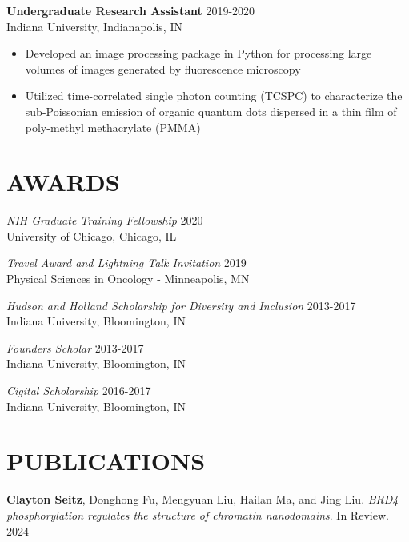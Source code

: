 \documentclass[margin, 10pt]{res} %
\begin{document}
\begin{resume}
\begin{itemize}
\end{itemize}
 
\textbf{Undergraduate Research Assistant} \hfill 2019-2020\\
Indiana University, Indianapolis, IN
\begin{itemize} \itemsep -2pt

\item Developed an image processing package in Python for processing large volumes of images generated by fluorescence microscopy

\item Utilized time-correlated single photon counting (TCSPC) to characterize the sub-Poissonian emission of organic quantum dots dispersed in a thin film of poly-methyl methacrylate (PMMA)


\end{itemize} 



\section{AWARDS}

{\sl NIH Graduate Training Fellowship} \hfill 2020 \\
University of Chicago, Chicago, IL

{\sl Travel Award and Lightning Talk Invitation} \hfill 2019 \\
Physical Sciences in Oncology - Minneapolis, MN

{\sl Hudson and Holland Scholarship for Diversity and Inclusion} \hfill 2013-2017 \\
Indiana University, Bloomington, IN 

{\sl Founders Scholar} \hfill 2013-2017 \\
Indiana University, Bloomington, IN 

{\sl Cigital Scholarship} \hfill 2016-2017 \\
Indiana University, Bloomington, IN 

\section{PUBLICATIONS}

\textbf{Clayton Seitz}\textsuperscript{\textdagger}, Donghong Fu\textsuperscript{\textdagger}, Mengyuan Liu, Hailan Ma, and Jing Liu. \textit{BRD4 phosphorylation regulates the structure of chromatin nanodomains}. In Review. 2024


\end{resume}
\end{document}
